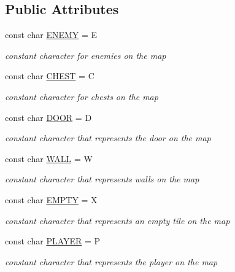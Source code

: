 \subsection*{Public Attributes}
\begin{DoxyCompactItemize}
\item 
\hypertarget{class_map_aa371d8a6997ec2deefba623c85004e16}{}\label{class_map_aa371d8a6997ec2deefba623c85004e16} 
const char \hyperlink{class_map_aa371d8a6997ec2deefba623c85004e16}{E\+N\+E\+MY} = \textquotesingle{}E\textquotesingle{}
\begin{DoxyCompactList}\small\item\em constant character for enemies on the map \end{DoxyCompactList}\item 
\hypertarget{class_map_aa9063243fe34eb14c69989cbf3892775}{}\label{class_map_aa9063243fe34eb14c69989cbf3892775} 
const char \hyperlink{class_map_aa9063243fe34eb14c69989cbf3892775}{C\+H\+E\+ST} = \textquotesingle{}C\textquotesingle{}
\begin{DoxyCompactList}\small\item\em constant character for chests on the map \end{DoxyCompactList}\item 
\hypertarget{class_map_a77671baf198d1acd80f10fbad82fdafc}{}\label{class_map_a77671baf198d1acd80f10fbad82fdafc} 
const char \hyperlink{class_map_a77671baf198d1acd80f10fbad82fdafc}{D\+O\+OR} = \textquotesingle{}D\textquotesingle{}
\begin{DoxyCompactList}\small\item\em constant character that represents the door on the map \end{DoxyCompactList}\item 
\hypertarget{class_map_a3304f5267a1d8463edca5e752c068669}{}\label{class_map_a3304f5267a1d8463edca5e752c068669} 
const char \hyperlink{class_map_a3304f5267a1d8463edca5e752c068669}{W\+A\+LL} = \textquotesingle{}W\textquotesingle{}
\begin{DoxyCompactList}\small\item\em constant character that represents walls on the map \end{DoxyCompactList}\item 
\hypertarget{class_map_a1b6940ab6119ae3bd35252db73039262}{}\label{class_map_a1b6940ab6119ae3bd35252db73039262} 
const char \hyperlink{class_map_a1b6940ab6119ae3bd35252db73039262}{E\+M\+P\+TY} = \textquotesingle{}X\textquotesingle{}
\begin{DoxyCompactList}\small\item\em constant character that represents an empty tile on the map \end{DoxyCompactList}\item 
\hypertarget{class_map_a88f3516fe75aa6317bb5417668ed4b25}{}\label{class_map_a88f3516fe75aa6317bb5417668ed4b25} 
const char \hyperlink{class_map_a88f3516fe75aa6317bb5417668ed4b25}{P\+L\+A\+Y\+ER} = \textquotesingle{}P\textquotesingle{}
\begin{DoxyCompactList}\small\item\em constant character that represents the player on the map \end{DoxyCompactList}\end{DoxyCompactItemize}
